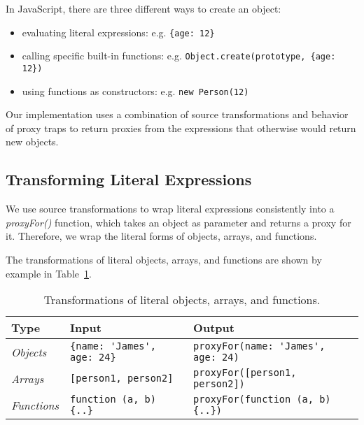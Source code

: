 In JavaScript, there are three different ways to create an object: 
\begin{itemize}
    \item evaluating literal expressions: e.g. \lstinline|{age: 12}|
    \item calling specific built-in functions: e.g. \lstinline|Object.create(prototype, {age: 12})|
    \item using functions as constructors: e.g. \lstinline|new Person(12)|
\end{itemize}



Our implementation uses a combination of source transformations and behavior of proxy traps to return proxies from the expressions that otherwise would return new objects.




\subsection{Transforming Literal Expressions}

We use source transformations to wrap literal expressions consistently into a \emph{proxyFor()} function, which takes an object as parameter and returns a proxy for it.
Therefore, we wrap the literal forms of objects, arrays, and functions.

The transformations of literal objects, arrays, and functions are shown by example in Table~\ref{table:literalTransforms}.

\begin{table}[h]
\begin{center}
\begin{tabular}{| l | l | l |}
\hline
Type & Input & Output \\ \hline
\emph{Objects} & \lstinline|{name: 'James', age: 24}| & \lstinline|proxyFor(name: 'James', age: 24)| \\ \hline
\emph{Arrays} & \lstinline|[person1, person2]| & \lstinline|proxyFor([person1, person2])| \\ \hline
\emph{Functions} & \lstinline|function (a, b) {..}| & \lstinline|proxyFor(function (a, b) {..})| \\ \hline
\end{tabular}
\end{center}
\caption[Table caption text]{Transformations of literal objects, arrays, and functions.}
\label{table:literalTransforms}
\end{table}

